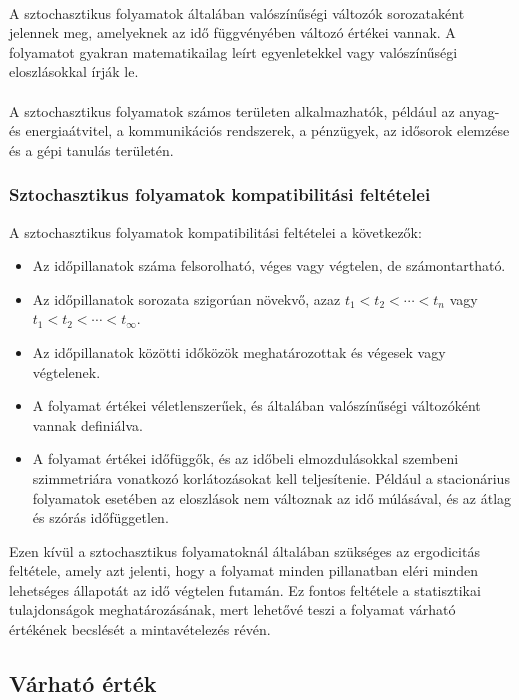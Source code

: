 \documentclass[11pt,a4pape,draftr]{article}
\begin{document}
				\paragraph{}
					A sztochasztikus folyamatok általában valószínűségi változók sorozataként jelennek meg, amelyeknek az idő függvényében változó értékei vannak. A folyamatot gyakran matematikailag leírt egyenletekkel vagy valószínűségi eloszlásokkal írják le.
				\paragraph{}
					A sztochasztikus folyamatok számos területen alkalmazhatók, például az anyag- és energiaátvitel, a kommunikációs rendszerek, a pénzügyek, az idősorok elemzése és a gépi tanulás területén.
				\subsubsection{Sztochasztikus folyamatok kompatibilitási feltételei}
					A sztochasztikus folyamatok kompatibilitási feltételei a következők:
					\begin{itemize}
					   \item Az időpillanatok száma felsorolható, véges vagy végtelen, de számontartható.
					   \item Az időpillanatok sorozata szigorúan növekvő, azaz $t_1 < t_2 < \cdots < t_n$ vagy $t_1 < t_2 < \cdots < t_{\infty}$.
					   \item Az időpillanatok közötti időközök meghatározottak és végesek vagy végtelenek.
					   \item A folyamat értékei véletlenszerűek, és általában valószínűségi változóként vannak definiálva.
					   \item A folyamat értékei időfüggők, és az időbeli elmozdulásokkal szembeni szimmetriára vonatkozó korlátozásokat kell teljesítenie. Például a stacionárius folyamatok esetében az eloszlások nem változnak az idő múlásával, és az átlag és szórás időfüggetlen.
					\end{itemize}
					Ezen kívül a sztochasztikus folyamatoknál általában szükséges az ergodicitás feltétele, amely azt jelenti, hogy a folyamat minden pillanatban eléri minden lehetséges állapotát az idő végtelen futamán. Ez fontos feltétele a statisztikai tulajdonságok meghatározásának, mert lehetővé teszi a folyamat várható értékének becslését a mintavételezés révén.
			\subsection{Várható érték}
\end{document}
